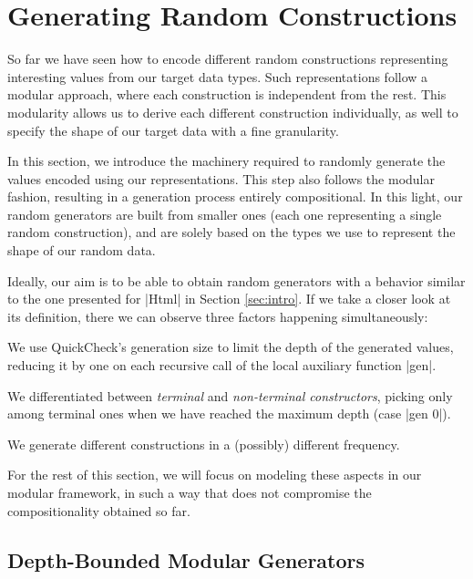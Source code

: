 \section{Generating Random Constructions}
\label{sec:generators}

%
So far we have seen how to encode different random constructions representing
interesting values from our target data types.
%
Such representations follow a modular approach, where each construction is
independent from the rest.
%
This modularity allows us to derive each different construction individually, as
well to specify the shape of our target data with a fine granularity.


In this section, we introduce the machinery required to randomly generate the
values encoded using our representations.
%
This step also follows the modular fashion, resulting in a generation process
entirely compositional.
%
In this light, our random generators are built from smaller ones (each one
representing a single random construction), and are solely based on the types we
use to represent the shape of our random data.


Ideally, our aim is to be able to obtain random generators with a behavior
similar to the one presented for |Html| in Section \ref{sec:intro}.
%
If we take a closer look at its definition, there we can observe three factors
happening simultaneously:
%
\vspace{2pt}
\begin{CompactItemize}
\item We use QuickCheck's generation size to limit the depth of the generated
  values, reducing it by one on each recursive call of the local auxiliary
  function |gen|.
\item We differentiated between \emph{terminal} and \emph{non-terminal
    constructors}, picking only among terminal ones when we have reached the
  maximum depth (case |gen 0|).
\item We generate different constructions in a (possibly) different frequency.
\end{CompactItemize}
%
For the rest of this section, we will focus on modeling these aspects in our
modular framework, in such a way that does not compromise the compositionality
obtained so far.


%
\subsection{Depth-Bounded Modular Generators}

